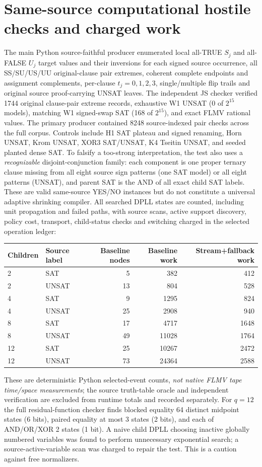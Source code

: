 \documentclass[10pt]{article}
\begin{document}
\section{Same-source computational hostile checks and charged work}
The main Python source-faithful producer enumerated local all-TRUE $S_j$ and all-FALSE $U_j$ target values and their inversions for each signed source occurrence, all SS/SU/US/UU original-clause pair extremes, coherent complete endpoints and assignment complements, per-clause $t_j=0,1,2,3$, single/multiple flip trails and original source proof-carrying UNSAT leaves. The independent JS checker verified 1744 original clause-pair extreme records, exhaustive W1 UNSAT (0 of $2^{15}$ models), matching W1 signed-swap SAT (168 of $2^{15}$), and exact FLMV rational values. The primary producer contained 8248 source-indexed pair checks across the full corpus. Controls include H1 SAT plateau and signed renaming, Horn UNSAT, Krom UNSAT, XOR3 SAT/UNSAT, K4 Tseitin UNSAT, and seeded planted dense SAT.
To falsify a too-strong interpretation, the test also uses a \emph{recognizable} disjoint-conjunction family: each component is one proper ternary clause missing from all eight source sign patterns (one SAT model) or all eight patterns (UNSAT), and parent SAT is the AND of all exact child SAT labels. These are valid same-source YES/NO instances but do not constitute a universal adaptive shrinking compiler. All searched DPLL states are counted, including unit propagation and failed paths, with source scans, active support discovery, policy cost, transport, child-status checks and switching charged in the selected operation ledger:
\begin{center}\small
\begin{tabular}{llrrr}\toprule
Children & Source label & Baseline nodes & Baseline work & Stream+fallback work\\\midrule
2 & SAT & 5 & 382 & 412\\
2 & UNSAT &13&804&528\\
4 & SAT &9&1295&824\\
4 & UNSAT &25&2908&940\\
8 & SAT &17&4717&1648\\
8 & UNSAT &49&11028&1764\\
12 & SAT &25&10267&2472\\
12 & UNSAT &73&24364&2588\\\bottomrule
\end{tabular}
\end{center}
These are deterministic Python selected-event counts, \emph{not native FLMV tape time/space measurements}; the source truth-table oracle and independent verification are excluded from runtime totals and recorded separately. For $q=12$ the full residual-function checker finds blocked equality 64 distinct midpoint states (6 bits), paired equality at most 3 states (2 bits), and each of AND/OR/XOR 2 states (1 bit). A naive child DPLL choosing inactive globally numbered variables was found to perform unnecessary exponential search; a source-active-variable scan was charged to repair the test. This is a caution against free normalizers.
\end{document}
